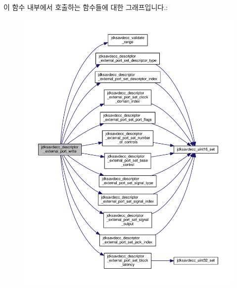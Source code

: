 이 함수 내부에서 호출하는 함수들에 대한 그래프입니다.\+:
\nopagebreak
\begin{figure}[H]
\begin{center}
\leavevmode
\includegraphics[width=350pt]{group__descriptor__external__port_ga65d622ba2c52e2ee2a1cfb2ceffcb271_cgraph}
\end{center}
\end{figure}


